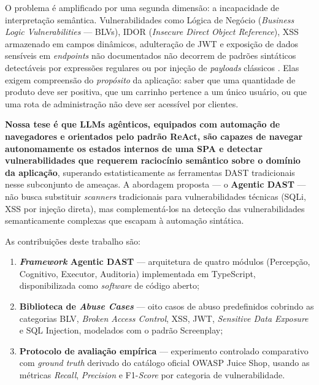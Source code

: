 \documentclass[
    10pt,
    twocolumn,
    a4paper
]{article}
\begin{document}
O problema é amplificado por uma segunda dimensão: a incapacidade de
interpretação semântica. Vulnerabilidades como Lógica de Negócio
(\textit{Business Logic Vulnerabilities} --- BLVs), IDOR
(\textit{Insecure Direct Object Reference}), XSS armazenado em campos
dinâmicos, adulteração de JWT e exposição de dados sensíveis em
\textit{endpoints} não documentados não decorrem de padrões sintáticos
detectáveis por expressões regulares ou por injeção de \textit{payloads}
clássicos \cite{portswigger2024, karadbhajne2025}. Elas exigem
compreensão do \textit{propósito} da aplicação: saber que uma quantidade
de produto deve ser positiva, que um carrinho pertence a um único usuário,
ou que uma rota de administração não deve ser acessível por clientes.

\textbf{Nossa tese é que LLMs agênticos, equipados com automação de
navegadores e orientados pelo padrão ReAct, são capazes de navegar
autonomamente os estados internos de uma SPA e detectar vulnerabilidades
que requerem raciocínio semântico sobre o domínio da aplicação},
superando estatisticamente as ferramentas DAST tradicionais nesse
subconjunto de ameaças. A abordagem proposta --- o \textbf{Agentic DAST}
--- não busca substituir \textit{scanners} tradicionais para
vulnerabilidades técnicas (SQLi, XSS por injeção direta), mas
complementá-los na detecção das vulnerabilidades semanticamente
complexas que escapam à automação sintática.

As contribuições deste trabalho são:

\begin{enumerate}\setlength{\itemsep}{2pt}
  \item \textbf{\textit{Framework} Agentic DAST} — arquitetura de quatro
  módulos (Percepção, Cognitivo, Executor, Auditoria) implementada em
  TypeScript, disponibilizada como \textit{software} de código aberto;

  \item \textbf{Biblioteca de \textit{Abuse Cases}} — oito casos de abuso
  predefinidos cobrindo as categorias BLV, \textit{Broken Access Control},
  XSS, JWT, \textit{Sensitive Data Exposure} e SQL Injection, modelados
  com o padrão Screenplay;

  \item \textbf{Protocolo de avaliação empírica} — experimento controlado
  comparativo com \textit{ground truth} derivado do catálogo oficial
  OWASP Juice Shop, usando as métricas \textit{Recall}, \textit{Precision}
  e F1-\textit{Score} por categoria de vulnerabilidade.
\end{enumerate}
\end{document}
